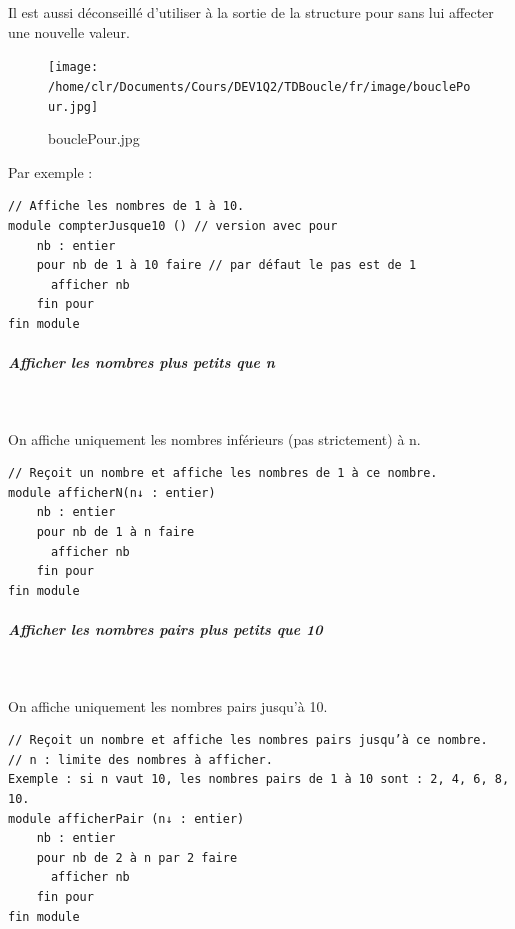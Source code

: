 \documentclass[11pt,a4paper]{article}
\begin{document}
            \par
        
        Il est aussi d\'econseill\'e d'utiliser \verb@variable@ \`a la sortie
        de la structure pour sans lui affecter une nouvelle valeur.
      
            \par
        \begin{figure}[hbt]
				    \begin{center}
					\texttt{[image: /home/clr/Documents/Cours/DEV1Q2/TDBoucle/fr/image/bouclePour.jpg]}
						\end{center}
                
                    \caption[bouclePour.jpg]{bouclePour.jpg}
                \end{figure}
                    
            \par
        Par exemple : 
            \par
        \begin{verbatim}
// Affiche les nombres de 1 à 10.
module compterJusque10 () // version avec pour
    nb : entier
    pour nb de 1 à 10 faire // par défaut le pas est de 1
      afficher nb
    fin pour
fin module
    \end{verbatim}
			
		\subparagraph{Afficher les nombres plus petits que n} 
		
					\textcolor{white}{.} \par
				On affiche uniquement les nombres inf\'erieurs (pas strictement) \`a n.
            \par
        \begin{verbatim}
// Reçoit un nombre et affiche les nombres de 1 à ce nombre.
module afficherN(n↓ : entier)
    nb : entier
    pour nb de 1 à n faire
      afficher nb
    fin pour
fin module
    \end{verbatim}
			
		\subparagraph{Afficher les nombres pairs plus petits que 10} 
		
					\textcolor{white}{.} \par
				On affiche uniquement les nombres pairs jusqu'\`a 10.
            \par
        \begin{verbatim}
// Reçoit un nombre et affiche les nombres pairs jusqu’à ce nombre.
// n : limite des nombres à afficher.
Exemple : si n vaut 10, les nombres pairs de 1 à 10 sont : 2, 4, 6, 8, 10.
module afficherPair (n↓ : entier)
    nb : entier
    pour nb de 2 à n par 2 faire
      afficher nb
    fin pour
fin module
    \end{verbatim}
			
\end{document}
